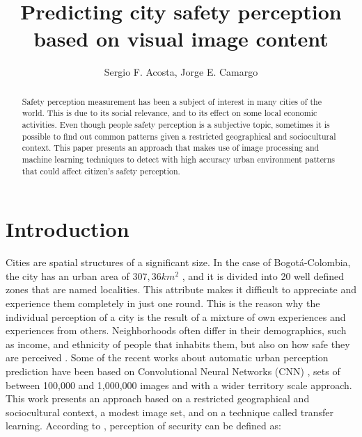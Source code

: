 \documentclass{llncs}
\begin{document}
\title{Predicting city safety perception based on visual image content}



\author{Sergio F. Acosta, Jorge E. Camargo}


\maketitle

\begin{abstract}
Safety perception measurement has been a subject of interest in many cities of the world. This is due to its social relevance, and to its effect on some local economic activities. Even though people safety perception is a subjective topic, sometimes it is possible to find out common patterns given a restricted geographical and sociocultural context. This paper presents an approach that makes use of image processing and machine learning techniques to detect with high accuracy urban environment patterns that could affect citizen's safety perception. 
\end{abstract}













\section{Introduction}
Cities are spatial structures of a significant size. In the case of Bogotá-Colombia, the city has an urban area of $307,36 km^{2}$ , and it is divided into 20 well defined zones that are named localities.  This attribute makes it difficult to appreciate and experience them completely in just one round. This is the reason why the individual perception of a city is the result of a mixture of own experiences and experiences from others. Neighborhoods often differ in their demographics, such as income, and ethnicity of people that inhabits them, but also on how safe they are perceived \cite{Kominers2015}. Some of the recent works about automatic urban perception prediction have been based on Convolutional Neural Networks (CNN) \cite{Krizhevsky2012}, sets of between 100,000 and 1,000,000 images and with a wider territory scale approach. This work presents an approach based on a restricted geographical and sociocultural context, a modest image set, and on a technique called transfer learning. According to \cite{Gomez2016}, perception of security can be defined as:
\end{document}
